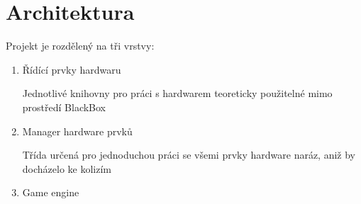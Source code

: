 \chapter{Architektura}

Projekt je rozdělený na tři vrstvy:

\begin{enumerate}
    \item Řídící prvky hardwaru

    Jednotlivé knihovny pro práci s hardwarem teoreticky použitelné mimo prostředí BlackBox

    \item Manager hardware prvků
    
    Třída určená pro jednoduchou práci se všemi prvky hardware naráz, aniž by docházelo ke kolizím

    \item Game engine
    
\end{enumerate}